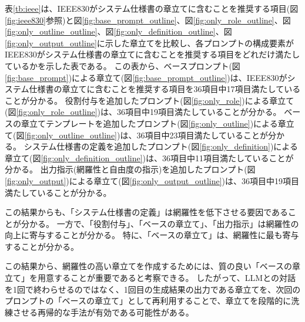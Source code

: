

表\ref{tb:ieee}は、IEEE830がシステム仕様書の章立てに含むことを推奨する項目(図\ref{fig:ieee830}参照)と図\ref{fig:base_prompt_outline}、図\ref{fig:only_role_outline}、図\ref{fig:only_outline_outline}、図\ref{fig:only_definition_outline}、図\ref{fig:only_output_outline}に示した章立てを比較し、各プロンプトの構成要素がIEEE830がシステム仕様書の章立てに含むことを推奨する項目をどれだけ満たしているかを示した表である。
この表から、ベースプロンプト(図\ref{fig:base_prompt})による章立て(図\ref{fig:base_prompt_outline})は、IEEE830がシステム仕様書の章立てに含むことを推奨する項目を36項目中17項目満たしていることが分かる。
役割付与を追加したプロンプト(図\ref{fig:only_role})による章立て(図\ref{fig:only_role_outline})は、36項目中19項目満たしていることが分かる。
ベースの章立てテンプレートを追加したプロンプト(図\ref{fig:only_outline})による章立て(図\ref{fig:only_outline_outline})は、36項目中23項目満たしていることが分かる。
システム仕様書の定義を追加したプロンプト(図\ref{fig:only_definition})による章立て(図\ref{fig:only_definition_outline})は、36項目中11項目満たしていることが分かる。
出力指示(網羅性と自由度の指示)を追加したプロンプト(図\ref{fig:only_output})による章立て(図\ref{fig:only_output_outline})は、36項目中19項目満たしていることが分かる。

この結果からも、「システム仕様書の定義」は網羅性を低下させる要因であることが分かる。
一方で、「役割付与」、「ベースの章立て」、「出力指示」は網羅性の向上に寄与することが分かる。
特に、「ベースの章立て」は、網羅性に最も寄与することが分かる。

この結果から、網羅性の高い章立てを作成するためには、質の良い「ベースの章立て」を用意することが重要であると考察できる。
したがって、LLMとの対話を1回で終わらせるのではなく、1回目の生成結果の出力である章立てを、次回のプロンプトの「ベースの章立て」として再利用することで、章立てを段階的に洗練させる再帰的な手法が有効である可能性がある。


